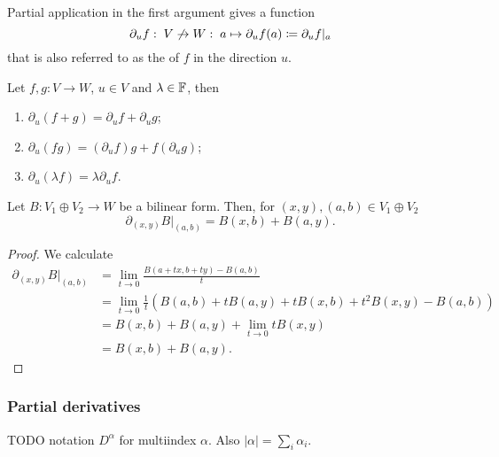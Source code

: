 Partial application in the first argument gives a function
\[ \partial_u f:\; V\not\to W:\; a\mapsto \partial_u f(a) \coloneqq \partial_u f|_a \]
that is also referred to as the  of $f$ in the direction $u$.

\begin{lemma}
Let $f,g: V\to W$, $u\in V$ and $\lambda\in\mathbb{F}$, then
\begin{enumerate}
\item $\partial_u(f+g) = \partial_uf + \partial_u g$;
\item $\partial_u(fg) = (\partial_uf)g + f(\partial_u g)$;
\item $\partial_u(\lambda f) = \lambda \partial_uf$.
\end{enumerate}
\end{lemma}

\begin{proposition} \label{derivativeBilinearForm}
Let $B: V_1 \oplus V_2 \to W$ be a bilinear form. Then, for $(x,y),(a,b)\in V_1\oplus V_2$
\[ \partial_{(x,y)}B|_{(a,b)} = B(x,b) + B(a,y). \]
\end{proposition}
\begin{proof}
We calculate
\begin{align*}
\partial_{(x,y)}B|_{(a,b)} &= \lim_{t\to 0} \frac{B(a+tx, b+ty) - B(a,b)}{t} \\
&= \lim_{t\to 0} \frac{1}{t} (B(a,b) + tB(a,y) + tB(x,b) + t^2B(x,y) - B(a,b)) \\
&=B(x,b) + B(a,y) + \lim_{t\to 0} tB(x,y) \\
&= B(x,b) + B(a,y).
\end{align*}
\end{proof}

\subsubsection{Partial derivatives}
TODO notation $D^\alpha$ for multiindex $\alpha$. Also $|\alpha| = \sum_i \alpha_i$.

